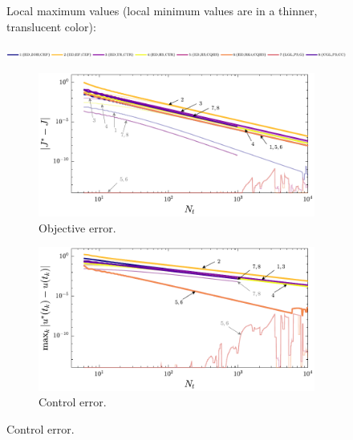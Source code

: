 \begin{figure}%
\centering

{\footnotesize Local maximum values (local minimum values are in a thinner, translucent color):}

\includegraphics[width=\textwidth]{../ch5/figures/ex1_sens_legend}%

\vspace{1mm}

\begin{subfigure}{0.5\textwidth}
\centering
\includegraphics[width=\textwidth]{../ch5/figures/ex2_sens_objective}%
\caption{Objective error.}
\label{fig:ch5:ex2sens:objective}
\end{subfigure}%
\begin{subfigure}{0.5\textwidth}
\centering
\includegraphics[width=\textwidth]{../ch5/figures/ex2_sens_control}%
\caption{Control error.}
\label{fig:ch5:ex2sens:control}
\end{subfigure}%


\end{figure}
